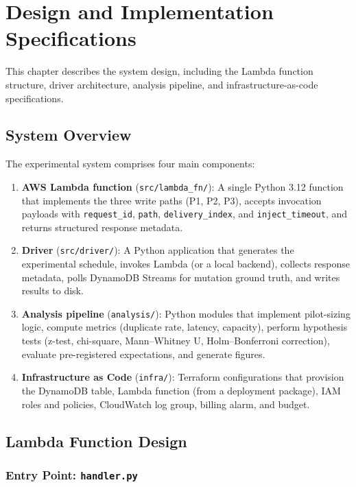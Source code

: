 \chapter{Design and Implementation Specifications}

This chapter describes the system design, including the Lambda function structure, driver architecture, analysis pipeline, and infrastructure-as-code specifications.

\section{System Overview}

The experimental system comprises four main components:

\begin{enumerate}
    \item \textbf{AWS Lambda function} (\texttt{src/lambda\_fn/}): A single Python 3.12 function that implements the three write paths (P1, P2, P3), accepts invocation payloads with \texttt{request\_id}, \texttt{path}, \texttt{delivery\_index}, and \texttt{inject\_timeout}, and returns structured response metadata.
    \item \textbf{Driver} (\texttt{src/driver/}): A Python application that generates the experimental schedule, invokes Lambda (or a local backend), collects response metadata, polls DynamoDB Streams for mutation ground truth, and writes results to disk.
    \item \textbf{Analysis pipeline} (\texttt{analysis/}): Python modules that implement pilot-sizing logic, compute metrics (duplicate rate, latency, capacity), perform hypothesis tests (z-test, chi-square, Mann–Whitney U, Holm–Bonferroni correction), evaluate pre-registered expectations, and generate figures.
    \item \textbf{Infrastructure as Code} (\texttt{infra/}): Terraform configurations that provision the DynamoDB table, Lambda function (from a deployment package), IAM roles and policies, CloudWatch log group, billing alarm, and budget.
\end{enumerate}

\section{Lambda Function Design}

\subsection{Entry Point: \texttt{handler.py}}

